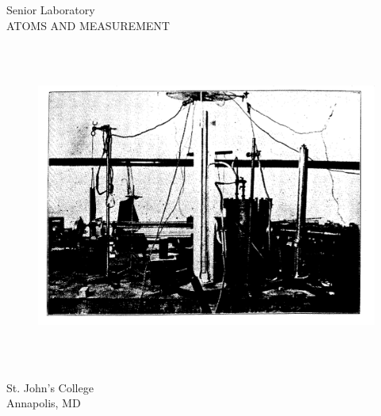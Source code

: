 \vspace*{.5in}
\begin{center}
{\large Senior Laboratory} \\
  \vspace{.5in}
{\LARGE ATOMS AND MEASUREMENT}

\begin{figure}[h]
    \includegraphics[width=5.91667in,height=4.21667in]{images/00_cover/millikan-apparatus.png}
\end{figure}
\vspace{.5in}
    St. John's College\\ 
    Annapolis, MD
\end{center}
